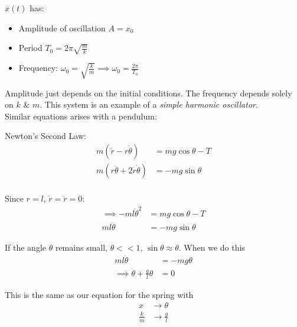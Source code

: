 \documentclass[twoside]{scrartcl}
\let\oldhat\hat
\renewcommand{\hat}[1]{\,\oldhat{\boldsymbol{\mathbf{#1}}}}
\begin{document}
$x(t)$ has:
\begin{itemize}
  \item Amplitude of oscillation $A = x_0$
  \item Period $T_0 = 2\pi\sqrt{\frac{m}{k}}$
  \item Frequency: $\omega_0 = \sqrt{\frac{k}{m}} \implies \omega_0 = \frac{2\pi}{T_0}$
\end{itemize}

Amplitude just depends on the initial conditions. The frequency depends solely on $k$ \& $m$. This system is an example of a \emph{simple harmonic oscillator}.\\

 Similar equations arises with a pendulum:
\begin{center}
\end{center}

Newton's Second Law:
\[
\begin{aligned}
  m(\ddot{r} - r\dot{\theta}) &= mg\cos\theta - T\\
  m(r\ddot{\theta} + 2\dot{r}\dot{\theta}) &= -mg\sin\theta\\
\end{aligned}
\]

Since $r = l$, $\dot{r} = \ddot{r} = 0$:
\[
\begin{aligned}
  \implies -ml\dot{\theta}^2 &= mg\cos\theta - T\\
  ml\ddot{\theta} &= -mg\sin\theta 
\end{aligned}
\]

If the angle $\theta$ remains small, $\theta << 1$, $\sin\theta \approx \theta$. When we do this 
\[
\begin{aligned}
  ml\ddot{\theta} &= -mg\theta\\
  \implies \ddot{\theta} + \frac{g}{l}\theta &= 0 
\end{aligned}
\]

This is the same as our equation for the spring with 
\[
\begin{aligned}
  x &\longrightarrow \theta\\
  \frac{k}{m} &\longrightarrow \frac{g}{l}
\end{aligned}
\]
\end{document}
